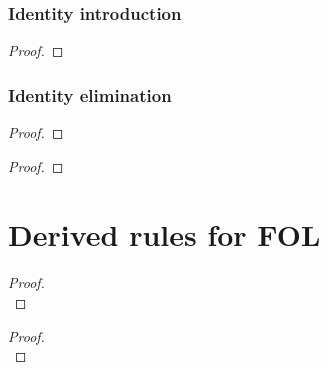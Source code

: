 \bigskip 

\subsubsection*{Identity introduction}

\begin{proof}
	 
\end{proof}


\subsubsection*{Identity elimination}

\begin{multicols}{2}
\begin{proof}
	 
\end{proof}
\begin{proof}
	 
\end{proof}
\end{multicols}


\bigskip 
\section{Derived rules for FOL}
\begin{multicols}{2}
\begin{proof}

\\	
\end{proof}
\begin{proof}

\\	
\end{proof}
\end{multicols}

